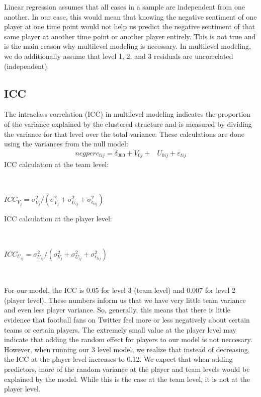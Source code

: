 \documentclass[12pt,twoside]{reedthesis}
\begin{document}
Linear regression assumes that all cases in a sample are independent
from one another. In our case, this would mean that knowing the negative
sentiment of one player at one time point would not help us predict the
negative sentiment of that same player at another time point or another
player entirely. This is not true and is the main reason why multilevel
modeling is necessary. In multilevel modeling, we do additionally assume
that level 1, 2, and 3 residuals are uncorrelated (independent).

\subsection{ICC}\label{icc}

The intraclass correlation (ICC) in multilevel modeling indicates the
proportion of the variance explained by the clustered structure and is
measured by dividing the variance for that level over the total
variance. These calculations are done using the variances from the null
model:
\begin{align*}
negperc_{tij} = \delta_{000} + V_{0j} + &U_{0ij} + \varepsilon_{tij}
\end{align*}
ICC calculation at the team level:

\(~\)

\(ICC_{V_j} = \sigma_{V_j}^2/(\sigma_{V_j}^2+\sigma_{U_{ij}}^2+\sigma_{\epsilon_{tij}}^2)\)

ICC calculation at the player level:

\(~\)

\(ICC_{U_{ij}} = \sigma_{U_{ij}}^2/(\sigma_{V_j}^2+\sigma_{U_{ij}}^2+\sigma_{\epsilon_{tij}}^2)\)

\(~\)

For our model, the ICC is 0.05 for level 3 (team level) and 0.007 for
level 2 (player level). These numbers inform us that we have very little
team variance and even less player variance. So, generally, this means
that there is little evidence that football fans on Twitter feel more or
less negatively about certain teams or certain players. The extremely
small value at the player level may indicate that adding the random
effect for players to our model is not neccesary. However, when running
our 3 level model, we realize that instead of decreasing, the ICC at the
player level increases to 0.12. We expect that when adding predictors,
more of the random variance at the player and team levels would be
explained by the model. While this is the case at the team level, it is
not at the player level.
\end{document}
